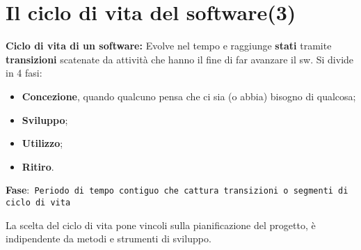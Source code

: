 




\section{Il ciclo di vita del software(3)}

\textbf{Ciclo di vita di un software:} Evolve nel tempo e raggiunge \textbf{stati} tramite \textbf{transizioni} scatenate da attività che hanno il fine di far avanzare il sw. Si divide in 4 fasi:

\begin{itemize}

	\item \textbf{Concezione}, quando qualcuno pensa che ci sia (o abbia) bisogno di qualcosa;
	\item \textbf{Sviluppo};
	\item \textbf{Utilizzo};
	\item \textbf{Ritiro}.

\end{itemize}

\textbf{Fase}:\texttt{ Periodo di tempo contiguo che cattura transizioni o segmenti di ciclo di vita}

La scelta del ciclo di vita pone vincoli sulla pianificazione del progetto, è indipendente da metodi e strumenti di sviluppo.\\

